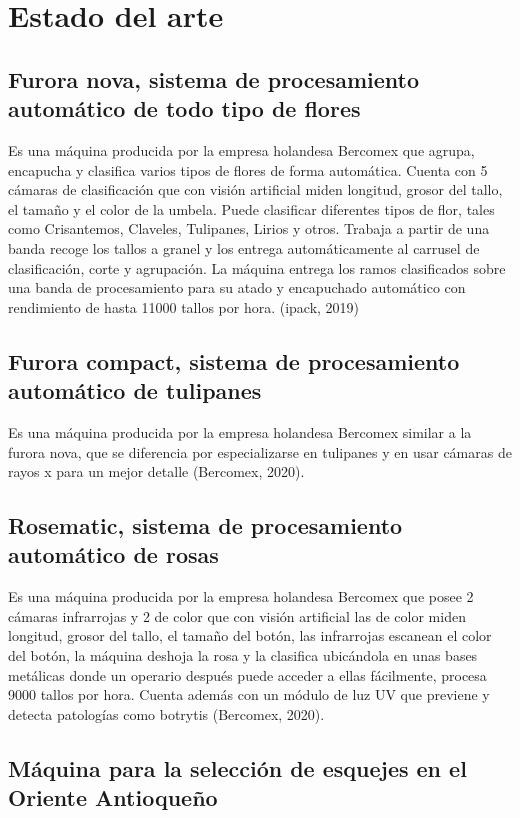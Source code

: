 \section{Estado del arte}

\subsection{Furora nova, sistema de procesamiento automático de todo tipo de flores }

Es una máquina producida por la empresa holandesa Bercomex que agrupa, encapucha y clasifica varios tipos de flores de forma automática. Cuenta con 5 cámaras de clasificación que con visión artificial miden longitud, grosor del tallo, el tamaño y el color de la umbela. Puede clasificar diferentes tipos de flor, tales como Crisantemos, Claveles, Tulipanes, Lirios y otros. Trabaja a partir de una banda recoge los tallos a granel y los entrega automáticamente al carrusel de clasificación, corte y agrupación. La máquina entrega los ramos clasificados sobre una banda de procesamiento para su atado y encapuchado automático con rendimiento de hasta 11000 tallos por hora.  (ipack, 2019) 

\subsection{Furora compact, sistema de procesamiento automático de tulipanes }

Es una máquina producida por la empresa holandesa Bercomex similar a la furora nova, que se diferencia por especializarse en tulipanes y en usar cámaras de rayos x para un mejor detalle  (Bercomex, 2020). 

\subsection{Rosematic, sistema de procesamiento automático de rosas}

Es una máquina producida por la empresa holandesa Bercomex que posee 2 cámaras infrarrojas y 2 de color que con visión artificial las de color miden longitud, grosor del tallo, el tamaño del botón, las infrarrojas escanean el color del botón, la máquina deshoja la rosa y la clasifica ubicándola en unas bases metálicas donde un operario después puede acceder a ellas fácilmente, procesa 9000 tallos por hora. Cuenta además con un módulo de luz UV que previene y detecta patologías como botrytis (Bercomex, 2020). 

\subsection{Máquina para la selección de esquejes en el Oriente Antioqueño} 

